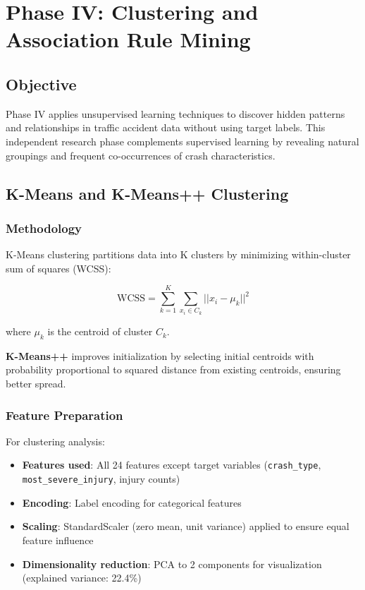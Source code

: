 \documentclass[12pt,man]{apa7}
\begin{document}
\section{Phase IV: Clustering and Association Rule Mining}

\subsection{Objective}

Phase IV applies unsupervised learning techniques to discover hidden patterns and relationships in traffic accident data without using target labels. This independent research phase complements supervised learning by revealing natural groupings and frequent co-occurrences of crash characteristics.

\subsection{K-Means and K-Means++ Clustering}

\subsubsection{Methodology}

K-Means clustering partitions data into K clusters by minimizing within-cluster sum of squares (WCSS):

\begin{equation}
\text{WCSS} = \sum_{k=1}^{K} \sum_{x_i \in C_k} ||x_i - \mu_k||^2
\end{equation}

where $\mu_k$ is the centroid of cluster $C_k$.

\textbf{K-Means++} improves initialization by selecting initial centroids with probability proportional to squared distance from existing centroids, ensuring better spread.

\subsubsection{Feature Preparation}

For clustering analysis:
\begin{itemize}
    \item \textbf{Features used}: All 24 features except target variables (\texttt{crash\_type}, \texttt{most\_severe\_injury}, injury counts)
    \item \textbf{Encoding}: Label encoding for categorical features
    \item \textbf{Scaling}: StandardScaler (zero mean, unit variance) applied to ensure equal feature influence
    \item \textbf{Dimensionality reduction}: PCA to 2 components for visualization (explained variance: 22.4\%)
\end{itemize}
\end{document}

